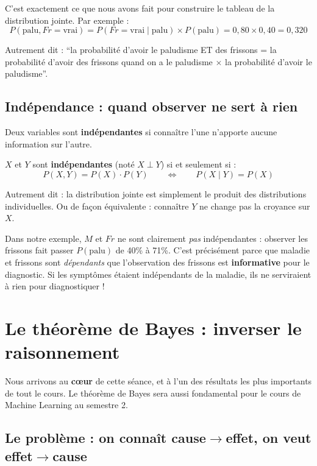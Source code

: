 \documentclass[11pt,a4paper]{article}
\begin{document}
C'est exactement ce que nous avons fait pour construire le tableau de la distribution jointe. Par exemple :
$$P(\text{palu}, Fr = \text{vrai}) = P(Fr = \text{vrai} \mid \text{palu}) \times P(\text{palu}) = 0{,}80 \times 0{,}40 = 0{,}320$$

Autrement dit  : ``la probabilité d'avoir le paludisme ET des frissons = la probabilité d'avoir des frissons quand on a le paludisme $\times$ la probabilité d'avoir le paludisme''.

\subsection{Indépendance : quand observer ne sert à rien}

Deux variables sont \textbf{indépendantes} si connaître l'une n'apporte aucune information sur l'autre.

\begin{definitionbox}
$X$ et $Y$ sont \textbf{indépendantes} (noté $X \perp Y$) si et seulement si :
$$P(X, Y) = P(X) \cdot P(Y) \qquad \Leftrightarrow \qquad P(X \mid Y) = P(X)$$

Autrement dit  : la distribution jointe est simplement le produit des distributions individuelles. Ou de façon équivalente : connaître $Y$ ne change pas la croyance sur $X$.
\end{definitionbox}

Dans notre exemple, $M$ et $Fr$ ne sont clairement \textit{pas} indépendantes : observer les frissons fait passer $P(\text{palu})$ de 40\% à 71\%. C'est précisément parce que maladie et frissons sont \textit{dépendants} que l'observation des frissons est \textbf{informative} pour le diagnostic. Si les symptômes étaient indépendants de la maladie, ils ne serviraient à rien pour diagnostiquer !

\section{Le théorème de Bayes : inverser le raisonnement}

Nous arrivons au \textbf{cœur} de cette séance, et à l'un des résultats les plus importants de tout le cours. Le théorème de Bayes sera aussi fondamental pour le cours de Machine Learning au semestre 2.

\subsection{Le problème : on connaît cause$\to$effet, on veut effet$\to$cause}
\end{document}
